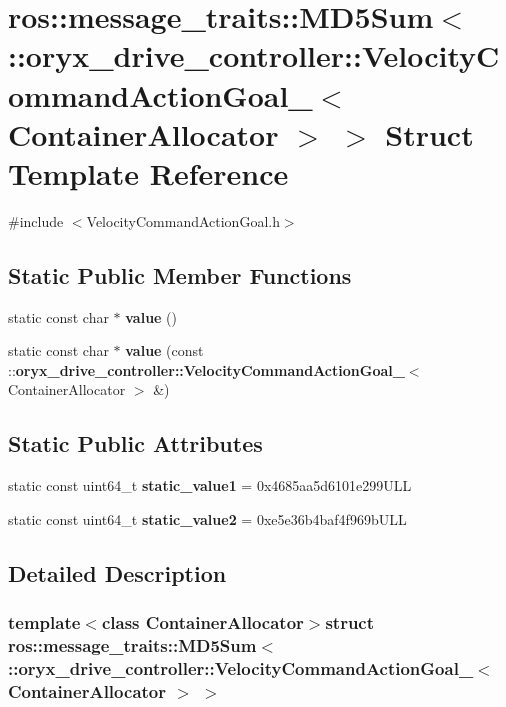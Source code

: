 \section{ros\-:\-:message\-\_\-traits\-:\-:\-M\-D5\-Sum$<$ \-:\-:oryx\-\_\-drive\-\_\-controller\-:\-:\-Velocity\-Command\-Action\-Goal\-\_\-$<$ \-Container\-Allocator $>$ $>$ \-Struct \-Template \-Reference}
\label{structros_1_1message__traits_1_1MD5Sum_3_01_1_1oryx__drive__controller_1_1VelocityCommandActionG1d04f26da469addc2ff03febc046aac0}


{\ttfamily \#include $<$\-Velocity\-Command\-Action\-Goal.\-h$>$}

\subsection*{\-Static \-Public \-Member \-Functions}
\begin{DoxyCompactItemize}
\item 
static const char $\ast$ {\bf value} ()
\item 
static const char $\ast$ {\bf value} (const \-::{\bf oryx\-\_\-drive\-\_\-controller\-::\-Velocity\-Command\-Action\-Goal\-\_\-}$<$ \-Container\-Allocator $>$ \&)
\end{DoxyCompactItemize}
\subsection*{\-Static \-Public \-Attributes}
\begin{DoxyCompactItemize}
\item 
static const uint64\-\_\-t {\bf static\-\_\-value1} = 0x4685aa5d6101e299\-U\-L\-L
\item 
static const uint64\-\_\-t {\bf static\-\_\-value2} = 0xe5e36b4baf4f969b\-U\-L\-L
\end{DoxyCompactItemize}


\subsection{\-Detailed \-Description}
\subsubsection*{template$<$class Container\-Allocator$>$struct ros\-::message\-\_\-traits\-::\-M\-D5\-Sum$<$ \-::oryx\-\_\-drive\-\_\-controller\-::\-Velocity\-Command\-Action\-Goal\-\_\-$<$ Container\-Allocator $>$ $>$}



